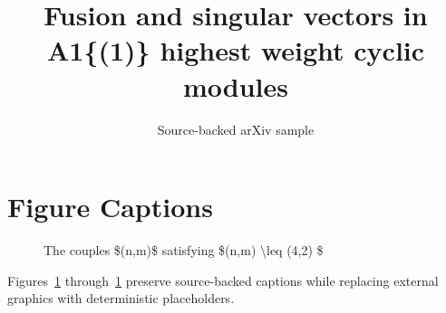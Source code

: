 \documentclass[11pt]{article}
\title{Fusion and singular vectors in A1\{(1)\} highest weight cyclic modules}
\author{Source-backed arXiv sample}
\date{}
\begin{document}
\maketitle
\section{Figure Captions}

\begin{figure}[htbp]
\centering
\fbox{\rule{0pt}{1.15in}\rule{0.78\linewidth}{0pt}}
\caption{The couples \$(n,m)\$ satisfying \$(n,m) \textbackslash{}leq (4,2) \$}
\label{fig:source-1}
\end{figure}


Figures~\ref{fig:source-1} through~\ref{fig:source-1} preserve source-backed captions while replacing external graphics with deterministic placeholders.
\end{document}
